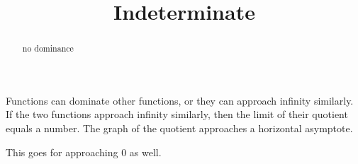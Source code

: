 \documentclass{ximera}
\title{Indeterminate}
\begin{document}
\begin{abstract}
no dominance
\end{abstract}
\maketitle





Functions can dominate other functions, or they can approach infinity similarly.  If the two functions approach infinity similarly, then the limit of their quotient equals a number.  The graph of the quotient approaches a horizontal asymptote. 

This goes for approaching $0$ as well. 
\end{document}
